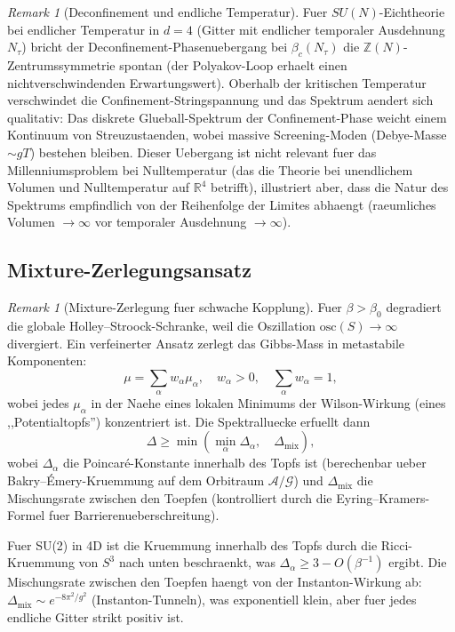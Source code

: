 \documentclass[12pt,a4paper]{article}
\theoremstyle{definition}
\theoremstyle{plain}
\theoremstyle{remark}
\newtheorem{remark}[definition]{Remark}
\begin{document}
\begin{remark}[Deconfinement und endliche Temperatur]
Fuer $SU(N)$-Eichtheorie bei endlicher Temperatur in $d = 4$ (Gitter mit endlicher temporaler Ausdehnung $N_\tau$) bricht der Deconfinement-Phasenuebergang bei $\beta_c(N_\tau)$ die $\mathbb{Z}(N)$-Zentrumssymmetrie spontan (der Polyakov-Loop erhaelt einen nichtverschwindenden Erwartungswert). Oberhalb der kritischen Temperatur verschwindet die Confinement-Stringspannung und das Spektrum aendert sich qualitativ: Das diskrete Glueball-Spektrum der Confinement-Phase weicht einem Kontinuum von Streuzustaenden, wobei massive Screening-Moden (Debye-Masse $\sim gT$) bestehen bleiben. Dieser Uebergang ist nicht relevant fuer das Millenniumsproblem bei Nulltemperatur (das die Theorie bei unendlichem Volumen und Nulltemperatur auf $\mathbb{R}^4$ betrifft), illustriert aber, dass die Natur des Spektrums empfindlich von der Reihenfolge der Limites abhaengt (raeumliches Volumen $\to \infty$ vor temporaler Ausdehnung $\to \infty$).
\end{remark}

\subsection{Mixture-Zerlegungsansatz}

\begin{remark}[Mixture-Zerlegung fuer schwache Kopplung]
\label{rem:mixture-decomposition}
Fuer $\beta > \beta_0$ degradiert die globale Holley--Stroock-Schranke, weil die Oszillation $\mathrm{osc}(S) \to \infty$ divergiert. Ein verfeinerter Ansatz zerlegt das Gibbs-Mass in metastabile Komponenten:
\[
\mu = \sum_{\alpha} w_\alpha \mu_\alpha, \quad w_\alpha > 0, \quad \sum_\alpha w_\alpha = 1,
\]
wobei jedes $\mu_\alpha$ in der Naehe eines lokalen Minimums der Wilson-Wirkung (eines ,,Potentialtopfs'') konzentriert ist. Die Spektralluecke erfuellt dann
\[
\Delta \geq \min\left( \min_\alpha \Delta_\alpha, \quad \Delta_{\mathrm{mix}} \right),
\]
wobei $\Delta_\alpha$ die Poincar\'e-Konstante innerhalb des Topfs ist (berechenbar ueber Bakry--\'Emery-Kruemmung auf dem Orbitraum $\mathcal{A}/\mathcal{G}$) und $\Delta_{\mathrm{mix}}$ die Mischungsrate zwischen den Toepfen (kontrolliert durch die Eyring--Kramers-Formel fuer Barrierenueberschreitung).

Fuer SU(2) in 4D ist die Kruemmung innerhalb des Topfs durch die Ricci-Kruemmung von $S^3$ nach unten beschraenkt, was $\Delta_\alpha \geq 3 - O(\beta^{-1})$ ergibt. Die Mischungsrate zwischen den Toepfen haengt von der Instanton-Wirkung ab: $\Delta_{\mathrm{mix}} \sim e^{-8\pi^2/g^2}$ (Instanton-Tunneln), was exponentiell klein, aber fuer jedes endliche Gitter strikt positiv ist.
\end{remark}
\end{document}
